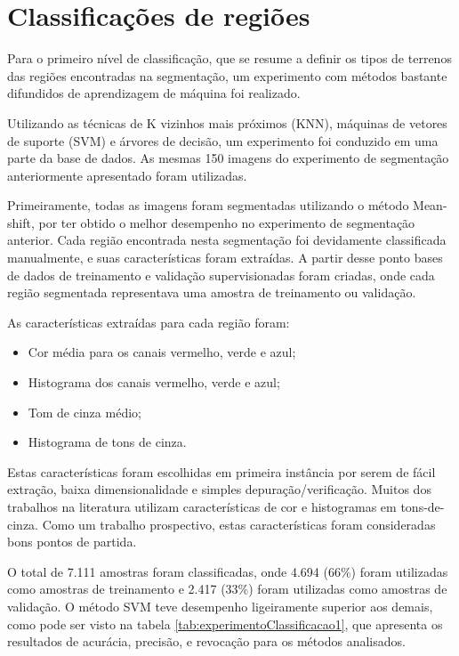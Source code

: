 \section{Classificações de regiões}

Para o primeiro nível de classificação, que se resume a definir os tipos de terrenos das regiões encontradas na segmentação, um experimento com métodos bastante difundidos de aprendizagem de máquina foi realizado.

Utilizando as técnicas de K vizinhos mais próximos (KNN), máquinas de vetores de suporte (SVM) e árvores de decisão, um experimento foi conduzido em uma parte da base de dados. As mesmas 150 imagens do experimento de segmentação anteriormente apresentado foram utilizadas.

Primeiramente, todas as imagens foram segmentadas utilizando o método Mean-shift, por ter obtido o melhor desempenho no experimento de segmentação anterior. Cada região encontrada nesta segmentação foi devidamente classificada manualmente, e suas características foram extraídas. A partir desse ponto bases de dados de treinamento e validação supervisionadas foram criadas, onde cada região segmentada representava uma amostra de treinamento ou validação.

As características extraídas para cada região foram:
\begin{itemize}
	\item Cor média para os canais vermelho, verde e azul;
	\item Histograma dos canais vermelho, verde e azul;
	\item Tom de cinza médio;
	\item Histograma de tons de cinza.
\end{itemize}

Estas características foram escolhidas em primeira instância por serem de fácil extração, baixa dimensionalidade e simples depuração/verificação. Muitos dos trabalhos na literatura utilizam características de cor e histogramas em tons-de-cinza. Como um trabalho prospectivo, estas características foram consideradas bons pontos de partida.

O total de 7.111 amostras foram classificadas, onde 4.694 (66\%) foram utilizadas como amostras de treinamento e 2.417 (33\%) foram utilizadas como amostras de validação. O método SVM teve desempenho ligeiramente superior aos demais, como pode ser visto na tabela \ref{tab:experimentoClassificacao1}, que apresenta os resultados de acurácia, precisão, e revocação para os métodos analisados.

